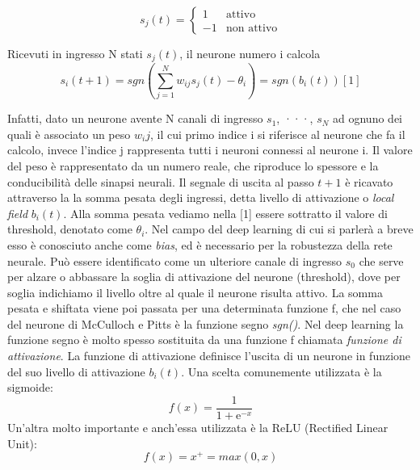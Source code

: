 \[s_j(t) = \left\{\begin{matrix}
    1 & \text{attivo}\\ 
    -1 & \text{non attivo}
    \end{matrix}\right.\]


Ricevuti in ingresso N stati \(s_j(t)\), il neurone numero i calcola 
\[s_i(t+1)= sgn(\sum_{j=1}^{N}w_{ij}s_j(t)-\theta_i)= sgn(b_i(t))      [1]\]

Infatti, dato un neurone avente N canali di ingresso \(s_1\), ···, \(s_N\) ad ognuno dei quali
è associato un peso \(w_ij\), il cui primo indice i si riferisce al neurone che fa il calcolo,
invece l’indice j rappresenta tutti 
i neuroni connessi al neurone i. Il valore del peso è rappresentato da un numero reale, 
che riproduce lo spessore e la conducibilità delle sinapsi neurali.
 Il segnale di uscita al passo \(t+1\) è ricavato attraverso la la somma pesata degli ingressi, 
detta livello di attivazione o \emph{local field} \(b_i(t)\). 
Alla somma pesata vediamo nella [1] essere sottratto il valore di threshold, denotato come \(\theta_i\). 
Nel campo del deep learning di cui si parlerà a breve esso è conosciuto 
anche come \emph{bias}, ed è necessario per la robustezza della rete neurale. Può essere identificato
 come un ulteriore canale di ingresso \(s_0\) che serve per alzare o 
abbassare la soglia di attivazione del neurone (threshold), dove per soglia indichiamo il livello oltre
 al quale il neurone risulta attivo. 
La somma pesata e shiftata viene poi passata per una determinata funzione f, 
che nel caso del neurone di McCulloch e Pitts  è la funzione segno \emph{sgn()}.
Nel deep learning la funzione segno è molto spesso sostituita da una funzione f chiamata
 \emph{funzione di attivazione}. La funzione di attivazione definisce l’uscita di un neurone 
 in funzione del suo livello di attivazione \(b_i(t)\).
Una scelta comunemente utilizzata è la sigmoide: 
\[f(x)= \frac{1}{1+\mathrm{e}^{-x}}\]
Un’altra molto importante e anch’essa utilizzata è la ReLU (Rectified Linear Unit):
\[f(x) = x^{+} = max(0,x)\]

